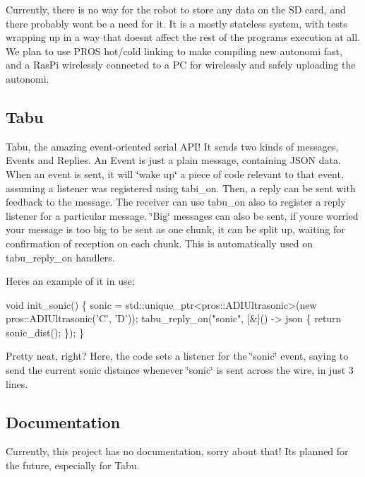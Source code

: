 Currently, there is no way for the robot to store any data on the SD card, and there probably won\textquotesingle{}t be a need for it. It is a mostly stateless system, with tests wrapping up in a way that doesn\textquotesingle{}t affect the rest of the program\textquotesingle{}s execution at all. We plan to use P\+R\+OS\textquotesingle{} hot/cold linking to make compiling new autonomi fast, and a Ras\+Pi wirelessly connected to a PC for wirelessly and safely uploading the autonomi.

\subsection*{Tabu}

Tabu, the amazing event-\/oriented serial A\+P\+I! It sends two kinds of messages, Events and Replies. An Event is just a plain message, containing J\+S\+ON data. When an event is sent, it will \char`\"{}wake up\char`\"{} a piece of code relevant to that event, assuming a listener was registered using {\ttfamily tabi\+\_\+on}. Then, a reply can be sent with feedback to the message. The receiver can use {\ttfamily tabu\+\_\+on} also to register a reply listener for a particular message. \char`\"{}\+Big\char`\"{} messages can also be sent, if you\textquotesingle{}re worried your message is too big to be sent as one chunk, it can be split up, waiting for confirmation of reception on each chunk. This is automatically used on {\ttfamily tabu\+\_\+reply\+\_\+on} handlers.

Here\textquotesingle{}s an example of it in use\+:


\begin{DoxyCode}
void init\_sonic() \{
  sonic = std::unique\_ptr<pros::ADIUltrasonic>(new pros::ADIUltrasonic('C', 'D'));
  tabu\_reply\_on("sonic", [&]() -> json \{
    return sonic\_dist();
  \});
\}
\end{DoxyCode}
 Pretty neat, right? Here, the code sets a listener for the \char`\"{}sonic\char`\"{} event, saying to send the current sonic distance whenever \char`\"{}sonic\char`\"{} is sent across the wire, in just 3 lines.

\subsection*{Documentation}

Currently, this project has no documentation, sorry about that! It\textquotesingle{}s planned for the future, especially for Tabu. 